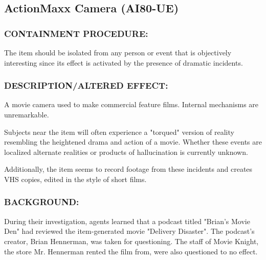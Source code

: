 \subsection*{ActionMaxx Camera (AI80-UE)}
\subsubsection*{CONTAINMENT PROCEDURE:}
\par The item should be isolated from any
person or event that is objectively
interesting since its effect is activated by
the presence of dramatic incidents.
\subsubsection*{DESCRIPTION/ALTERED EFFECT:}
\par A movie camera used to make
commercial feature films. Internal
mechanisms are unremarkable.
\par Subjects near the item will often experience a "torqued" version
of reality resembling the heightened drama and action of a movie.
Whether these events are localized alternate realities or products
of hallucination is currently unknown.
\par Additionally, the item seems to record footage from these
incidents and creates VHS copies, edited in the style of short
films.
\subsubsection*{BACKGROUND:}
\par During their investigation, agents learned that a podcast titled
"Brian's Movie Den" had reviewed the item-generated movie
"Delivery Disaster". The podcast's creator, Brian Hennerman, was
taken for questioning. The staff of Movie Knight, the store Mr.
Hennerman rented the film from, were also questioned to no
effect.